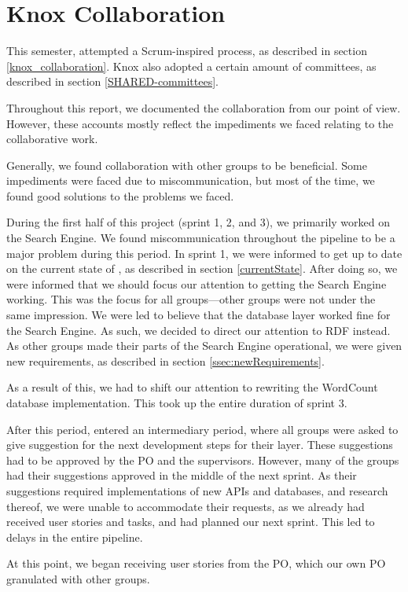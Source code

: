 \section{Knox Collaboration}
This semester, \knox{} attempted a Scrum-inspired process, as described in section \ref{knox_collaboration}. Knox also adopted a certain amount of committees, as described in section \ref{SHARED-committees}.

Throughout this report, we documented the \knox{} collaboration from our point of view. However, these accounts mostly reflect the impediments we faced relating to the collaborative work.

Generally, we found collaboration with other groups to be beneficial. Some impediments were faced due to miscommunication, but most of the time, we found good solutions to the problems we faced.

During the first half of this project (sprint 1, 2, and 3), we primarily worked on the Search Engine. We found miscommunication throughout the pipeline to be a major problem during this period. In sprint 1, we were informed to get up to date on the current state of \knox{}, as described in section \ref{currentState}. After doing so, we were informed that we should focus our attention to getting the Search Engine working. This was the focus for all groups---other groups were not under the same impression. We were led to believe that the database layer worked fine for the Search Engine. As such, we decided to direct our attention to RDF instead. As other groups made their parts of the Search Engine operational, we were given new requirements, as described in section \ref{ssec:newRequirements}.

As a result of this, we had to shift our attention to rewriting the WordCount database implementation. This took up the entire duration of sprint 3.

After this period, \knox{} entered an intermediary period, where all groups were asked to give suggestion for the next development steps for their layer. These suggestions had to be approved by the \knox{} PO and the \knox{} supervisors. However, many of the groups had their suggestions approved in the middle of the next sprint. As their suggestions required implementations of new APIs and databases, and research thereof, we were unable to accommodate their requests, as we already had received user stories and tasks, and had planned our next sprint. This led to delays in the entire pipeline.

At this point, we began receiving user stories from the \knox{} PO, which our own PO granulated with other \knox{} groups.

